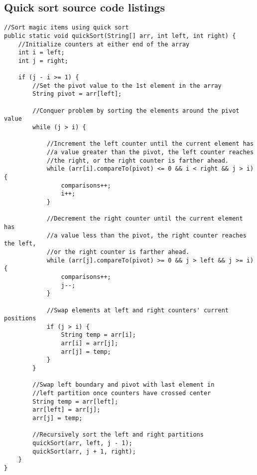 \documentclass[letterpaper, 10pt,DIV=13]{scrartcl}
\numberwithin{equation}{section} %
\numberwithin{figure}{section} %
\numberwithin{table}{section} %
\begin{document}
\subsection{Quick sort source code listings}
\lstset{numbers=left, numberstyle=\tiny, stepnumber=1, numbersep=5pt, basicstyle=\footnotesize\ttfamily}
\begin{lstlisting}[frame=single, ] 
//Sort magic items using quick sort
public static void quickSort(String[] arr, int left, int right) {
    //Initialize counters at either end of the array
    int i = left;
    int j = right;
    
    if (j - i >= 1) {
        //Set the pivot value to the 1st element in the array
        String pivot = arr[left];

        //Conquer problem by sorting the elements around the pivot value
        while (j > i) {
            
            //Increment the left counter until the current element has 
            //a value greater than the pivot, the left counter reaches
            //the right, or the right counter is farther ahead.
            while (arr[i].compareTo(pivot) <= 0 && i < right && j > i) {
                comparisons++;
                i++;
            }

            //Decrement the right counter until the current element has 
            //a value less than the pivot, the right counter reaches the left, 
            //or the right counter is farther ahead.
            while (arr[j].compareTo(pivot) >= 0 && j > left && j >= i) {
                comparisons++;
                j--;
            }

            //Swap elements at left and right counters' current positions
            if (j > i) {
                String temp = arr[i];
                arr[i] = arr[j];
                arr[j] = temp;
            }
        }

        //Swap left boundary and pivot with last element in 
        //left partition once counters have crossed center
        String temp = arr[left];
        arr[left] = arr[j];
        arr[j] = temp;
        
        //Recursively sort the left and right partitions
        quickSort(arr, left, j - 1);
        quickSort(arr, j + 1, right);
    }
}
\end{lstlisting}
\end{document}
